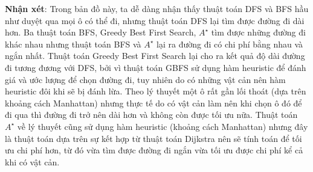 \documentclass[11pt]{article} %
\begin{document}
\begin{itemize}
	\textbf{Nhận xét}: Trong bản đồ này, ta dễ dàng nhận thấy thuật toán DFS và BFS hầu như duyệt qua mọi ô có thể đi, nhưng thuật toán DFS lại tìm được đường đi dài hơn. Ba thuật toán BFS, Greedy Best First Search, $A^{\star}$ tìm được những đường đi khác nhau nhưng thuật toán BFS và $A^{\star}$ lại ra đường đi có chi phí bằng nhau và ngắn nhất. Thuật toán Greedy Best First Search lại cho ra kết quả độ dài đường đi tương đương với DFS, bởi vì thuật toán GBFS sử dụng hàm heuristic để đánh giá và ước lượng để chọn đường đi, tuy nhiên do có những vật cản nên hàm heuristic đôi khi sẽ bị đánh lừa. Theo lý thuyết một ô rất gần lối thoát (dựa trên khoảng cách Manhattan) nhưng thực tế do có vật cản làm nên khi chọn ô đó để đi qua thì đường đi trở nên dài hơn và không còn được tối ưu nữa. Thuật toán $A^{\star}$ về lý thuyết cũng sử dụng hàm heuristic (khoảng cách Manhattan) nhưng đây là thuật toán dựa trên sự kết hợp từ thuật toán Dijkstra nên sẽ tính toán để tối ưu chi phí hơn, từ đó vừa tìm được đường đi ngắn vừa tối ưu được chi phí kể cả khi có vật cản.
	


\end{itemize}
\end{document}
